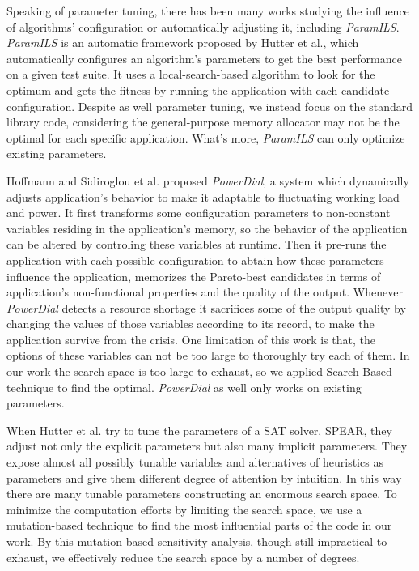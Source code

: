 Speaking of parameter tuning, there has been many works studying the influence of algorithms' configuration or automatically adjusting it, including \emph{ParamILS}\cite{hutter2009paramils}. \emph{ParamILS} is an automatic framework proposed by Hutter et al., which automatically configures an algorithm's parameters to get the best performance on a given test suite. It uses a local-search-based algorithm to look for the optimum and gets the fitness by running the application with each candidate configuration. Despite as well parameter tuning, we instead focus on the standard library code, considering the general-purpose memory allocator may not be the optimal for each specific application. What's more, \emph{ParamILS} can only optimize existing parameters. 

Hoffmann and Sidiroglou et al.\cite{Hoffmann:2011:DKR:1961296.1950390} proposed \emph{PowerDial}, a system which dynamically adjusts application's behavior to make it adaptable to fluctuating working load and power. It first transforms some configuration parameters to non-constant variables residing in the application's memory, so the behavior of the application can be altered by controling these variables at runtime. Then it pre-runs the application with each possible configuration to abtain how these parameters influence the application, memorizes the Pareto-best candidates in terms of application's non-functional properties and the quality of the output. Whenever \emph{PowerDial} detects a resource shortage it sacrifices some of the output quality by changing the values of those variables according to its record, to make the application survive from the crisis. One limitation of this work is that, the options of these variables can not be too large to thoroughly try each of them. In our work the search space is too large to exhaust, so we applied Search-Based technique to find the optimal. \emph{PowerDial} as well only works on existing parameters.

When Hutter et al.\cite{4401979} try to tune the parameters of a SAT solver, SPEAR, they adjust not only the explicit parameters but also many implicit parameters. They expose almost all possibly tunable variables and alternatives of heuristics as parameters and give them different degree of attention by intuition. In this way there are many tunable parameters constructing an enormous search space. To minimize the computation efforts by limiting the search space, we use a mutation-based technique to find the most influential parts of the code in our work. By this mutation-based sensitivity analysis, though still impractical to exhaust, we effectively reduce the search space by a number of degrees.
